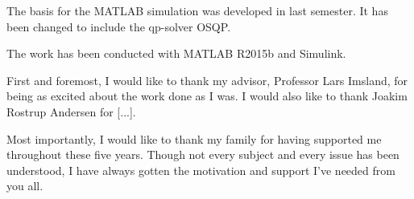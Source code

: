 The basis for the MATLAB simulation was developed in \cite{prosjekt_oppgave} last semester. It has been changed to include the \acrshort{qp}-solver OSQP.

The work has been conducted with MATLAB R2015b and Simulink.

First and foremost, I would like to thank my advisor, Professor Lars Imsland, for being as excited about the work done as I was. I would also like to thank Joakim Rostrup Andersen for [...]. 

Most importantly, I would like to thank my family for having supported me throughout these five years. Though not every subject and every issue has been understood, I have always gotten the motivation and support I've needed from you all.


